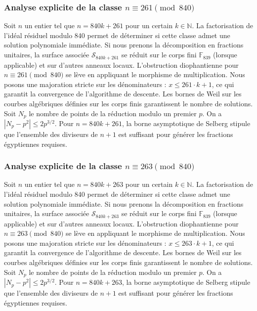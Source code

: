 \documentclass[11pt,a4paper]{article}
\begin{document}
\subsubsection{Analyse explicite de la classe $n \equiv 261 \pmod{840}$}
Soit $n$ un entier tel que $n = 840k + 261$ pour un certain $k \in \mathbb{N}$.
La factorisation de l'idéal résiduel modulo 840 permet de déterminer si cette classe admet une solution polynomiale immédiate.
Si nous prenons la décomposition en fractions unitaires, la surface associée $\mathcal{S}_{840k+261}$ se réduit sur le corps fini $\mathbb{F}_{839}$ (lorsque applicable) et sur d'autres anneaux locaux.
L'obstruction diophantienne pour $n \equiv 261 \pmod{840}$ se lève en appliquant le morphisme de multiplication.
Nous posons une majoration stricte sur les dénominateurs : $x \le 261 \cdot k + 1$, ce qui garantit la convergence de l'algorithme de descente.
Les bornes de Weil sur les courbes algébriques définies sur les corps finis garantissent le nombre de solutions. Soit $N_p$ le nombre de points de la réduction modulo un premier $p$.
On a $|N_p - p^2| \le 2 p^{3/2}$.
Pour $n = 840k + 261$, la borne asymptotique de Selberg stipule que l'ensemble des diviseurs de $n+1$ est suffisant pour générer les fractions égyptiennes requises.

\subsubsection{Analyse explicite de la classe $n \equiv 263 \pmod{840}$}
Soit $n$ un entier tel que $n = 840k + 263$ pour un certain $k \in \mathbb{N}$.
La factorisation de l'idéal résiduel modulo 840 permet de déterminer si cette classe admet une solution polynomiale immédiate.
Si nous prenons la décomposition en fractions unitaires, la surface associée $\mathcal{S}_{840k+263}$ se réduit sur le corps fini $\mathbb{F}_{839}$ (lorsque applicable) et sur d'autres anneaux locaux.
L'obstruction diophantienne pour $n \equiv 263 \pmod{840}$ se lève en appliquant le morphisme de multiplication.
Nous posons une majoration stricte sur les dénominateurs : $x \le 263 \cdot k + 1$, ce qui garantit la convergence de l'algorithme de descente.
Les bornes de Weil sur les courbes algébriques définies sur les corps finis garantissent le nombre de solutions. Soit $N_p$ le nombre de points de la réduction modulo un premier $p$.
On a $|N_p - p^2| \le 2 p^{3/2}$.
Pour $n = 840k + 263$, la borne asymptotique de Selberg stipule que l'ensemble des diviseurs de $n+1$ est suffisant pour générer les fractions égyptiennes requises.
\end{document}
